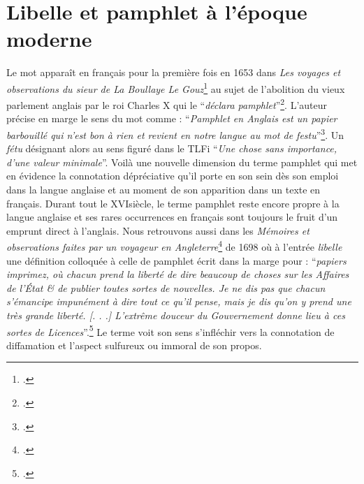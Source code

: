 \section{Libelle et pamphlet à l'époque moderne}
Le mot apparaît en français pour la première fois en 1653 dans \textit{Les voyages et observations du sieur de La Boullaye Le Gouz}\footcites{la_boullaye-le_gouz_les_1653} au sujet de l'abolition du vieux parlement anglais par le roi Charles X qui le \enquote{\textit{déclara pamphlet}}\footcites{la_boullaye-le_gouz_les_1653}. L'auteur précise en marge le sens du mot comme : \enquote{\textit{Pamphlet en Anglais est un papier barbouillé qui n'est bon à rien et revient en notre langue au mot de festu}}\footcites{la_boullaye-le_gouz_les_1653}. Un \textit{fétu} désignant alors au sens figuré dans le TLFi \enquote{\textit{Une chose sans importance, d'une valeur minimale}}. Voilà une nouvelle dimension du terme pamphlet qui met en évidence la connotation dépréciative qu'il porte en son sein dès son emploi dans la langue anglaise et au moment de son apparition dans un texte en français. Durant tout le XVI\ieme siècle, le terme pamphlet reste encore propre à la langue anglaise et ses rares occurrences en français sont toujours le fruit d'un emprunt direct à l'anglais. Nous retrouvons aussi dans les \textit{Mémoires et observations faites par un voyageur en Angleterre}\footcites{misson_de_valbourg_memoires_1698} de 1698 où à l'entrée \textit{libelle} une définition colloquée à celle de pamphlet écrit dans la marge pour : \enquote{\textit{papiers imprimez, où chacun prend la liberté de dire beaucoup de choses sur les Affaires de l'État \& de publier toutes sortes de nouvelles. Je ne dis pas que chacun s'émancipe impunément à dire tout ce qu'il pense, mais je dis qu'on y prend une très grande liberté. [. . .] L'extrême douceur du Gouvernement donne lieu à ces sortes de Licences}}.\footcites{misson_de_valbourg_memoires_1698} Le terme voit son sens s'infléchir vers la connotation de diffamation et l'aspect sulfureux ou immoral de son propos.

